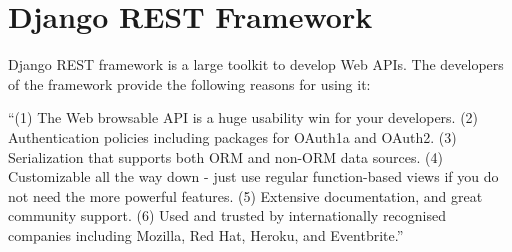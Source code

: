 \section{Django REST Framework}

Django REST framework is a large toolkit to develop Web APIs. The
developers of the framework provide the following reasons for using it:

``(1) The Web browsable API is a huge usability win for your
developers.  (2) Authentication policies including packages for
OAuth1a and OAuth2.  (3) Serialization that supports both ORM and
non-ORM data sources.  (4) Customizable all the way down - just use
regular function-based views if you do not need the more powerful
features.  (5) Extensive documentation, and great community support.
(6) Used and trusted by internationally recognised companies including
Mozilla, Red Hat, Heroku, and Eventbrite.''

